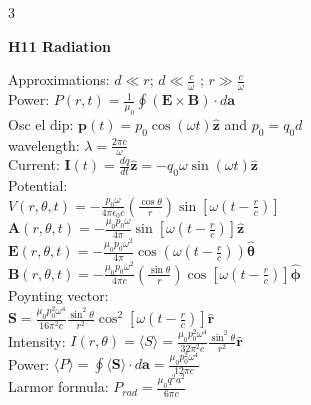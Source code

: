 \documentclass[a4paper,twoside]{article}
\newcommand{\secblock}[1]{%
\par\vspace{3pt}%
\noindent\colorbox{hdrcol}{\parbox[c][1.1em][c]{0.98\linewidth}{\color{white}\bfseries\small #1}}\par
\vspace{2pt}%
}
\begin{document}
\begin{multicols*}{3}
\secblock{H11 Radiation}
Approximations: \(d \ll r\); \(d \ll \frac{c}{\omega}\) ; \(r \gg \frac{c}{\omega}\)\\
Power: \(P(r,t) = \frac{1}{\mu_0} \oint (\bm E \times \bm B) \cdot d\bm a\)\\
Osc el dip: \(\bm p(t) =  p_0 \cos(\omega t) \hat{\bm z}\) and \(p_0 = q_0d\)\\
wavelength: \(\lambda = \frac{2\pi c}{\omega}\)\\
Current: \(\bm I(t)= \frac{d q}{dt} \hat{\bm z} = -q_0 \omega \sin(\omega t) \hat{\bm z}\)\\
Potential:\\
\(V(r, \theta , t) = - \frac{p_0 \omega}{4 \pi \epsilon_0 c} (\frac{\cos\theta}{r})\sin[\omega(t - \frac{r}{c})]\)\\
\(\bm A(r, \theta , t) = - \frac{\mu_0 p_0 \omega}{4 \pi} \sin[\omega(t - \frac{r}{c})]\hat{\bm z}\)\\
\(\bm E(r, \theta , t) = -\frac{\mu_0 p_0 \omega^2}{4 \pi}  \cos(\omega(t - \frac{r}{c}))\hat{\bm \theta}\)\\
\(\bm B(r, \theta , t) = - \frac{\mu_0 p_0 \omega^2}{4 \pi c} (\frac{\sin\theta}{r})\cos[\omega(t - \frac{r}{c})]\hat{\bm \phi}\)\\
Poynting vector:\\
\(\bm S = \frac{\mu_0 p_0^2 \omega^4}{16 \pi^2 c} \frac{\sin^2\theta}{r^2} \cos^2[\omega(t - \frac{r}{c})]\hat{\bm r}\)  \\
Intensity: \(I(r, \theta) = \langle S \rangle = \frac{\mu_0 p_0^2 \omega^4}{32 \pi^2 c} \frac{\sin^2\theta}{r^2}\hat{\bm r}\)   \\
Power: \(\langle P \rangle = \oint \langle \bm S \rangle \cdot d\bm a = \frac{\mu_0 p_0^2 \omega^4}{12 \pi c}\)\\
Larmor formula: \(P_{rad} = \frac{\mu_0 q^2 a^2}{6 \pi c}\)


\end{multicols*}
\end{document}
